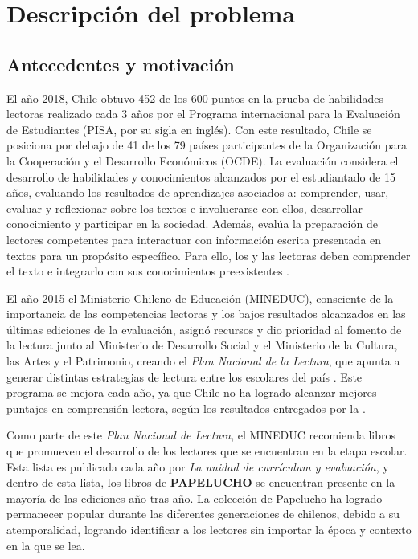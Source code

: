 
\chapter{Descripción del problema}\label{cap:introduccion}


\section{Antecedentes y motivación}\label{sec:motivacion}

El año 2018, Chile obtuvo 452 de los 600 puntos en la prueba de habilidades lectoras realizado cada 3 años por el Programa internacional para la Evaluación de Estudiantes (PISA, por su sigla en inglés). Con este resultado, Chile se posiciona por debajo de 41 de los 79 países participantes de la Organización para la Cooperación y el Desarrollo Económicos (OCDE). La evaluación considera el desarrollo de habilidades y conocimientos alcanzados por el estudiantado de 15 años, evaluando los resultados de aprendizajes asociados a: comprender, usar, evaluar y reflexionar sobre los textos e involucrarse con ellos, desarrollar conocimiento y participar en la sociedad. Además, evalúa la preparación de lectores competentes para interactuar con información escrita presentada en textos para un propósito específico. Para ello, los y las lectoras deben comprender el texto e integrarlo con sus conocimientos preexistentes \citep{CALIDAD2019}.

El año 2015 el Ministerio Chileno de Educación (MINEDUC), consciente de la importancia de las competencias lectoras y los bajos resultados alcanzados en las últimas ediciones de la evaluación, asignó recursos y dio prioridad al fomento de la lectura junto al Ministerio de Desarrollo Social y el Ministerio de la Cultura, las Artes y el Patrimonio, creando el \textit{Plan Nacional de la Lectura}, que apunta a generar distintas estrategias de lectura entre los escolares del país \citep{PLANNACIONAL2015}. Este programa se mejora cada año, ya que Chile no ha logrado alcanzar mejores puntajes en comprensión lectora, según los resultados entregados por la \citet{CALIDAD2019}.

Como parte de este \textit{Plan Nacional de Lectura}, el MINEDUC recomienda libros que promueven el desarrollo de los lectores que se encuentran en la etapa escolar. Esta lista es publicada cada año por \textit{La unidad de currículum y evaluación}, y dentro de esta lista, los libros de \textbf{PAPELUCHO} se encuentran presente en la mayoría de las ediciones año tras año. La colección de Papelucho ha logrado permanecer popular durante las diferentes generaciones de chilenos, debido a su atemporalidad, logrando identificar a los lectores sin importar la época y contexto en la que se lea. 

